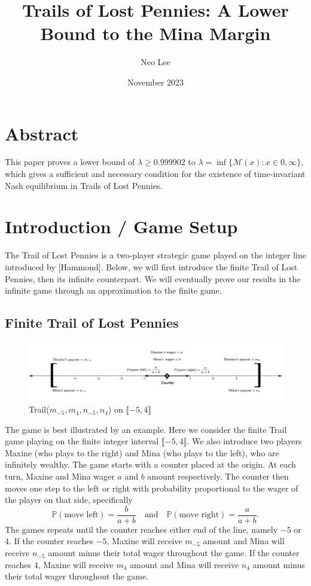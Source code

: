 \documentclass{article}
\title{Trails of Lost Pennies: A Lower Bound to the Mina Margin}
\author{Neo Lee}
\date{November 2023}
\newcommand*{\M}{\mathcal{M}}
\begin{document}
\maketitle

\section{\centering Abstract}
This paper proves a lower bound of $\lambda \geq 0.999902$ to $\lambda =
\inf\{\M(x):x\in0,\infty\}$, which gives a sufficient and necessary condition for the existence of
time-invariant Nash equilibrium in Trails of Lost Pennies.


\section{\centering Introduction / Game Setup}
The Trail of Lost Pennies is a two-player strategic game played on the integer line introduced by
[Hammond]. Below, we will first introduce the finite Trail of Lost Pennies, then its infinite
counterpart. We will eventually prove our results in the infinite game through an approximation to
the finite game.

\subsection{\centering Finite Trail of Lost Pennies}
\begin{figure}[htb!]
    \centering
    \includegraphics[scale=0.3]{finite_trail.png}
    \caption{Trail($m_{-5}, m_{4}, n_{-5}, n_{4}$) on $\llbracket-5, 4\rrbracket$}
\end{figure}

The game is best illustrated by an example. Here we consider the finite Trail game playing on the
finite integer interval $\llbracket-5, 4\rrbracket$. We also introduce two players Maxine (who plays
to the right) and Mina (who plays to the left), who are infinitely wealthy. The game starts with a
counter placed at the origin. At each turn, Maxine and Mina wager $a$ and $b$ amount respectively.
The counter then moves one step to the left or right with probability proportional to the wager of
the player on that side, specifically $$\mathds{P}(\text{move left}) = \frac{b}{a+b} \quad
\text{and} \quad \mathds{P}(\text{move right}) = \frac{a}{a+b}.$$ The games repeats until the
counter reaches either end of the line, namely $-5$ or $4$. If the counter reaches $-5$, Maxine will
receive $m_{-5}$ amount and Mina will receive $n_{-5}$ amount minus their total wager throughout the
game. If the counter reaches $4$, Maxine will receive $m_{4}$ amount and Mina will receive $n_{4}$
amount minus their total wager throughout the game.
\end{document}
